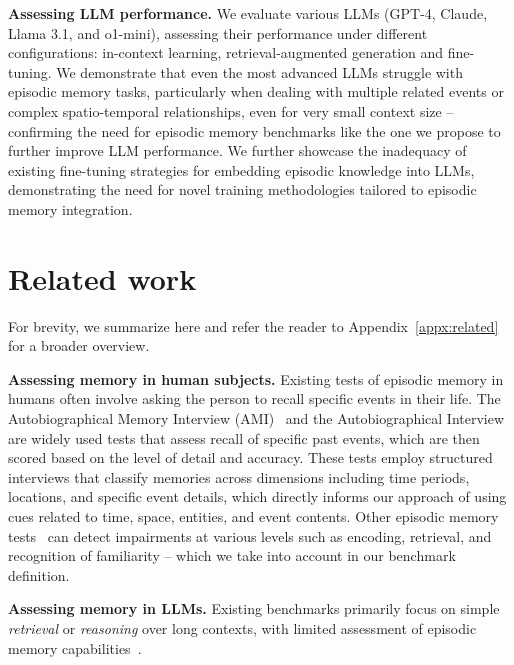 \documentclass{article}
\begin{document}
\noindent \textbf{Assessing LLM performance.} We evaluate various LLMs (GPT-4,  Claude, Llama 3.1, and o1-mini), assessing their performance under different configurations: in-context learning, retrieval-augmented generation and fine-tuning. We demonstrate that even the most advanced LLMs struggle with episodic memory tasks, particularly when dealing with multiple related events or complex spatio-temporal relationships, even for very small context size -- confirming the need for episodic memory benchmarks like the one we propose  to further improve LLM performance. We further showcase the inadequacy of existing fine-tuning strategies for embedding episodic knowledge into LLMs, demonstrating the need for novel training methodologies tailored to episodic memory integration.




\section{Related work}\label{sec:background}

For brevity, we summarize here and refer the reader to Appendix~\ref{appx:related} for a broader overview.

\noindent \textbf{Assessing memory in human subjects.}
Existing tests of episodic memory in humans often involve asking the person to recall specific events in their life. The Autobiographical Memory Interview (AMI)~\citep{Kopelman1994} and the Autobiographical Interview~\citep{levine2002aging} are widely used tests that assess recall of specific past events, which are then scored based on the level of detail and accuracy. These tests employ structured interviews that classify memories across dimensions including time periods, locations, and specific event details, which directly informs our approach of using cues related to time, space, entities, and event contents. Other episodic memory tests~\citep{Wilson1985, Delis2000} can detect impairments at various levels such as encoding, retrieval, and recognition of familiarity -- which we take into account in our benchmark definition.

\noindent \textbf{Assessing memory in LLMs.}
Existing benchmarks primarily focus on simple \textit{retrieval} or \textit{reasoning} over long contexts, with limited assessment of episodic memory capabilities~\citep{vodrahalli2024michelangelo}.
\end{document}
